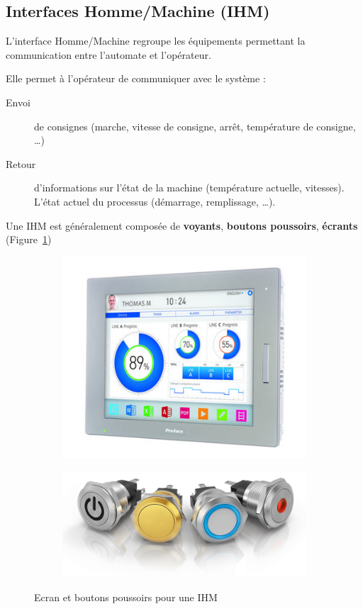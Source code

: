 \subsection{Interfaces Homme/Machine (IHM)}
L'interface Homme/Machine regroupe les équipements permettant la communication entre l'automate et l'opérateur.

 Elle permet à l'opérateur de communiquer avec le système :
 \begin{description}
   \item [Envoi] de consignes (marche, vitesse de consigne, arrêt, température de consigne, \dots)
   \item [Retour] d'informations sur l'état de la machine (température actuelle, vitesses). L'état actuel du processus (démarrage, remplissage, \dots).
 \end{description}

 Une IHM est généralement composée de \textbf{voyants}, \textbf{boutons poussoirs}, \textbf{écrants} (Figure~\ref{fig:IHM})


\begin{figure}
  \begin{subfigure}{0.49\textwidth}
    \centering
    \includegraphics[width=\linewidth, height=.15\textheight,keepaspectratio]{images/ecranIHM}
  \end{subfigure}%
%
  \begin{subfigure}{0.49\textwidth}
    \centering
    \includegraphics[width=\linewidth,height=.15\textheight,keepaspectratio]{images/boutons}
  \end{subfigure}
  \caption{Ecran et boutons poussoirs pour une IHM}
  \label{fig:IHM}
\end{figure}
